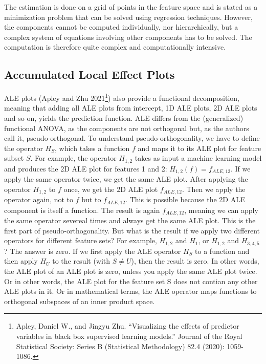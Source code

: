\documentclass[12pt,]{krantz}
\begin{document}
The estimation is done on a grid of points in the feature space and is
stated as a minimization problem that can be solved using regression
techniques. However, the components cannot be computed individually, nor
hierarchically, but a complex system of equations involving other
components has to be solved. The computation is therefore quite complex
and computationally intensive.

\subsection{Accumulated Local Effect
Plots}\label{accumulated-local-effect-plots}

ALE plots (Apley and Zhu 2021\footnote{Apley, Daniel W., and Jingyu Zhu.
  ``Visualizing the effects of predictor variables in black box
  supervised learning models.'' Journal of the Royal Statistical
  Society: Series B (Statistical Methodology) 82.4 (2020): 1059-1086.})
also provide a functional decomposition, meaning that adding all ALE
plots from intercept, 1D ALE plots, 2D ALE plots and so on, yields the
prediction function. ALE differs from the (generalized) functional
ANOVA, as the components are not orthogonal but, as the authors call it,
pseudo-orthogonal. To understand pseudo-orthogonality, we have to define
the operator \(H_S\), which takes a function \(f\) and maps it to its
ALE plot for feature subset \(S\). For example, the operator \(H_{1,2}\)
takes as input a machine learning model and produces the 2D ALE plot for
features 1 and 2: \(H_{1,2}(f) = f_{ALE,12}\). If we apply the same
operator twice, we get the same ALE plot. After applying the operator
\(H_{1,2}\) to \(f\) once, we get the 2D ALE plot \(f_{ALE,12}\). Then
we apply the operator again, not to \(f\) but to \(f_{ALE,12}\). This is
possible because the 2D ALE component is itself a function. The result
is again \(f_{ALE,12}\), meaning we can apply the same operator severeal
times and always get the same ALE plot. This is the first part of
pseudo-orthogonality. But what is the result if we apply two different
operators for different feature sets? For example, \(H_{1,2}\) and
\(H_{1}\), or \(H_{1,2}\) and \(H_{3,4,5}\)? The answer is zero. If we
first apply the ALE operator \(H_S\) to a function and then apply
\(H_U\) to the result (with \(S \neq U\)), then the result is zero. In
other words, the ALE plot of an ALE plot is zero, unless you apply the
same ALE plot twice. Or in other words, the ALE plot for the feature set
S does not contian any other ALE plots in it. Or in mathematical terms,
the ALE operator maps functions to orthogonal subspaces of an inner
product space.
\end{document}
